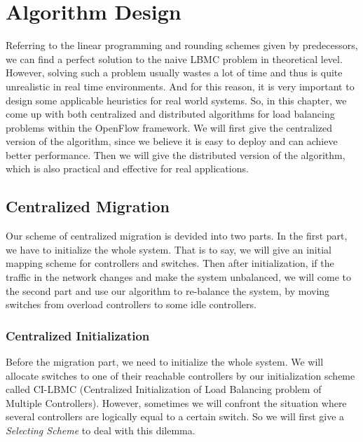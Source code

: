 

\chapter{Algorithm Design}
\label{chap:algorithm}

Referring to the linear programming and rounding schemes given by predecessors, we can find a perfect solution to the naive LBMC problem in theoretical level. However, solving such a problem usually wastes a lot of time and thus is quite unrealistic in real time environments. And for this reason, it is very important to design some applicable heuristics for real world systems. So, in this chapter, we come up with both centralized and distributed algorithms for load balancing problems within the OpenFlow framework. We will first give the centralized version of the algorithm, since we believe it is easy to deploy and can achieve better performance. Then we will give the distributed version of the algorithm, which is also practical and effective for real applications.

\vspace{-5pt}
\section{Centralized Migration}
Our scheme of centralized migration is devided into two parts. In the first part, we have to initialize the whole system. That is to say, we will give an initial mapping scheme for controllers and switches. Then after initialization, if the traffic in the network changes and make the system unbalanced, we will come to the second part and use our algorithm to re-balance the system, by moving switches from overload controllers to some idle controllers.

\subsection{Centralized Initialization}
Before the migration part, we need to initialize the whole system. We will allocate switches to one of their reachable controllers by our initialization scheme called CI-LBMC (Centralized Initialization of Load Balancing problem of Multiple Controllers). However, sometimes we will confront the situation where several controllers are logically equal to a certain switch. So we will first give a \emph{Selecting Scheme} to deal with this dilemma.

